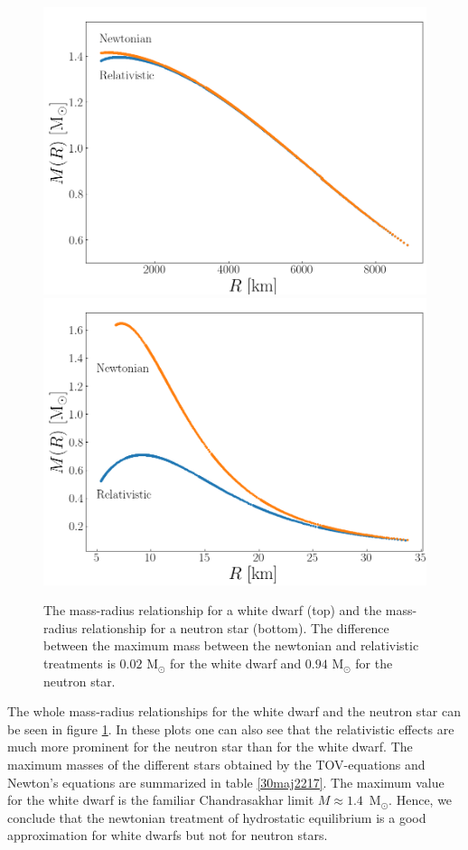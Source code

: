 \documentclass[twocolumn]{article}
\begin{document}
\begin{large}
\begin{figure}[!t]
    \begin{center}
        \includegraphics[scale=0.35]{WhiteDwarf_MR.png}
        \includegraphics[scale=0.35]{Neutron_MR.png}
    \end{center}
    \caption{The mass-radius relationship for a white dwarf (top) and the mass-radius relationship for a neutron star (bottom). The difference between the maximum mass between the newtonian and relativistic treatments is $0.02$ M$_\odot$ for the white dwarf and $0.94$ M$_\odot$ for the neutron star.}
    \label{30maj2012}
\end{figure}
The whole mass-radius relationships for the white dwarf and the neutron star can be seen in figure \ref{30maj2012}. In these plots one can also see that the relativistic effects are much more prominent for the neutron star than for the white dwarf. The maximum masses of the different stars obtained by the TOV-equations and Newton's equations are summarized in table \ref{30maj2217}. The maximum value for the white dwarf is the familiar Chandrasakhar limit \mbox{$M\approx 1.4$ M$_\odot$}. Hence, we conclude that the newtonian treatment of hydrostatic equilibrium is a good approximation for white dwarfs but not for neutron stars. 


\end{large}
\end{document}
